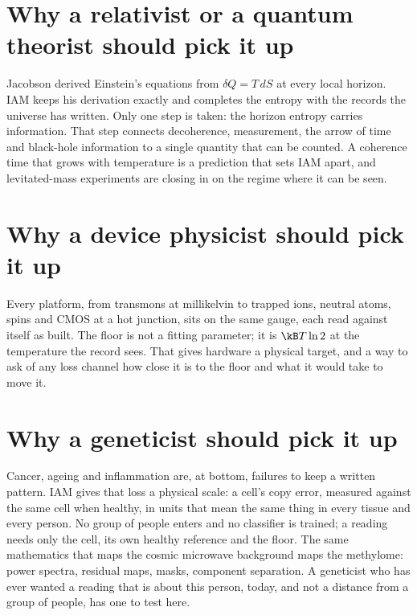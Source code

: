 \section*{Why a relativist or a quantum theorist should pick it up}
Jacobson derived Einstein's equations from $\delta Q=T\,dS$ at every local horizon. IAM keeps his derivation exactly and completes the entropy
with the records the universe has written. Only one step is taken: the horizon entropy carries information. That step connects decoherence,
measurement, the arrow of time and black-hole information to a single quantity that can be counted. A coherence time that grows with temperature
is a prediction that sets IAM apart, and levitated-mass experiments are closing in on the regime where it can be seen. \prediction

\section*{Why a device physicist should pick it up}
Every platform, from transmons at millikelvin to trapped ions, neutral atoms, spins and CMOS at a hot junction, sits on the same gauge, each read
against itself as built. The floor is not a fitting parameter; it is $\kB T\ln2$ at the temperature the record sees. That gives hardware a
physical target, and a way to ask of any loss channel how close it is to the floor and what it would take to move it. \derived

\section*{Why a geneticist should pick it up}
Cancer, ageing and inflammation are, at bottom, failures to keep a written pattern. IAM gives that loss a physical scale: a cell's copy error,
measured against the same cell when healthy, in units that mean the same thing in every tissue and every person. No group of people enters and no
classifier is trained; a reading needs only the cell, its own healthy reference and the floor. The same mathematics that maps the cosmic
microwave background maps the methylome: power spectra, residual maps, masks, component separation. A geneticist who has ever wanted a reading
that is about this person, today, and not a distance from a group of people, has one to test here. \interp

